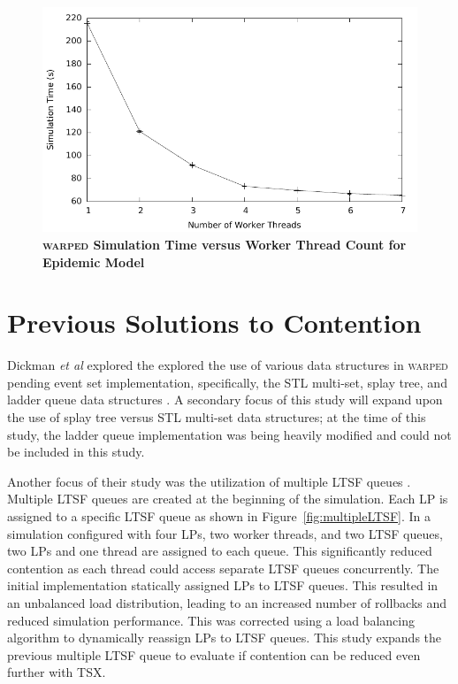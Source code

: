 \documentclass[11pt]{book}
\begin{document}
\begin{figure}[H]
    \centering
    \graphicspath{ {./figures/} }
    \includegraphics[width=\textwidth,height=\textheight,keepaspectratio]{notsx_profile}
    \caption{\textbf{\textsc{warped} Simulation Time versus Worker Thread Count for
    Epidemic Model}}
    \label{fig:notsx_profile}
\end{figure}

\section{Previous Solutions to Contention}

Dickman \emph{et al} explored the explored the use of various data structures in \textsc{warped}
pending event set implementation, specifically, the STL multi-set, splay tree, and ladder
queue data structures \cite{dickman}.  A secondary focus of this study will expand upon
the use of splay tree versus STL multi-set data structures; at the time of this study, the
ladder queue implementation was being heavily modified and could not be included in this
study.

Another focus of their study was the utilization of multiple LTSF queues \cite{dickman}.
Multiple LTSF queues are created at the beginning of the simulation.  Each LP is assigned
to a specific LTSF queue as shown in Figure~\ref{fig:multipleLTSF}.  In a simulation
configured with four LPs, two worker threads, and two LTSF queues, two LPs and one thread
are assigned to each queue.  This significantly reduced contention as each thread could
access separate LTSF queues concurrently.  The initial implementation statically assigned
LPs to LTSF queues.  This resulted in an unbalanced load distribution, leading to an
increased number of rollbacks and reduced simulation performance.  This was corrected
using a load balancing algorithm to dynamically reassign LPs to LTSF queues.  This study
expands the previous multiple LTSF queue to evaluate if contention can be reduced even
further with TSX.
\end{document}
